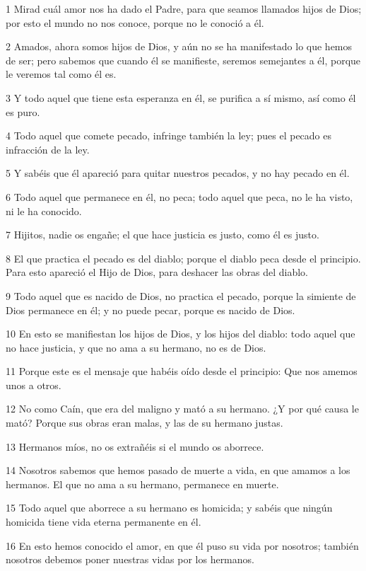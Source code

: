 \par 1 Mirad cuál amor nos ha dado el Padre, para que seamos llamados hijos de Dios; por esto el mundo no nos conoce, porque no le conoció a él.
\par 2 Amados, ahora somos hijos de Dios, y aún no se ha manifestado lo que hemos de ser; pero sabemos que cuando él se manifieste, seremos semejantes a él, porque le veremos tal como él es.
\par 3 Y todo aquel que tiene esta esperanza en él, se purifica a sí mismo, así como él es puro.
\par 4 Todo aquel que comete pecado, infringe también la ley; pues el pecado es infracción de la ley.
\par 5 Y sabéis que él apareció para quitar nuestros pecados, y no hay pecado en él.
\par 6 Todo aquel que permanece en él, no peca; todo aquel que peca, no le ha visto, ni le ha conocido.
\par 7 Hijitos, nadie os engañe; el que hace justicia es justo, como él es justo.
\par 8 El que practica el pecado es del diablo; porque el diablo peca desde el principio. Para esto apareció el Hijo de Dios, para deshacer las obras del diablo.
\par 9 Todo aquel que es nacido de Dios, no practica el pecado, porque la simiente de Dios permanece en él; y no puede pecar, porque es nacido de Dios.
\par 10 En esto se manifiestan los hijos de Dios, y los hijos del diablo: todo aquel que no hace justicia, y que no ama a su hermano, no es de Dios.
\par 11 Porque este es el mensaje que habéis oído desde el principio: Que nos amemos unos a otros.
\par 12 No como Caín, que era del maligno y mató a su hermano. ¿Y por qué causa le mató? Porque sus obras eran malas, y las de su hermano justas.
\par 13 Hermanos míos, no os extrañéis si el mundo os aborrece.
\par 14 Nosotros sabemos que hemos pasado de muerte a vida, en que amamos a los hermanos. El que no ama a su hermano, permanece en muerte.
\par 15 Todo aquel que aborrece a su hermano es homicida; y sabéis que ningún homicida tiene vida eterna permanente en él.
\par 16 En esto hemos conocido el amor, en que él puso su vida por nosotros; también nosotros debemos poner nuestras vidas por los hermanos.
